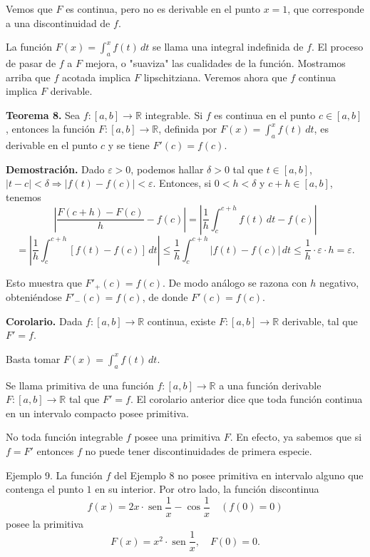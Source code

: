 \documentclass[12pt,oneside]{book}
\begin{document}
Vemos que \(F\) es continua, pero no es derivable en el punto \(x = 1\), que corresponde a una discontinuidad de \(f\).

La función \(F(x) = \int_a^x f(t) \, dt\) se llama una integral indefinida de \(f\). El proceso de pasar de \(f\) a \(F\) mejora, o "suaviza" las cualidades de la función. Mostramos arriba que \(f\) acotada implica \(F\) lipschitziana. Veremos ahora que \(f\) continua implica \(F\) derivable.

\textbf{Teorema 8.} Sea \(f: [a, b] \to \mathbb{R}\) integrable. Si \(f\) es continua en el punto \(c \in [a, b]\), entonces la función \(F: [a, b] \to \mathbb{R}\), definida por \(F(x) = \int_a^x f(t) \, dt\), es derivable en el punto \(c\) y se tiene \(F'(c) = f(c)\).

\textbf{Demostración.} Dado \(\varepsilon > 0\), podemos hallar \(\delta > 0\) tal que \(t \in [a, b]\), \(|t - c| < \delta \Rightarrow |f(t) - f(c)| < \varepsilon\). Entonces, si \(0 < h < \delta\) y \(c + h \in [a, b]\), tenemos
\[
\left| \frac{F(c + h) - F(c)}{h} - f(c) \right|= \left| \frac{1}{h} \int_c^{c+h} f(t) \, dt - f(c) \right|
\]
\[
= \left| \frac{1}{h} \int_c^{c+h} [f(t) - f(c)] \, dt \right|
\leq \frac{1}{h} \int_c^{c+h} |f(t) - f(c)| \, dt
\leq \frac{1}{h} \cdot \varepsilon \cdot h = \varepsilon.
\]

Esto muestra que \(F'_+(c) = f(c)\). De modo análogo se razona con \(h\) negativo, obteniéndose \(F'_-(c) = f(c)\), de donde \(F'(c) = f(c)\).

\textbf{Corolario.} Dada \(f: [a, b] \to \mathbb{R}\) continua, existe \(F: [a, b] \to \mathbb{R}\) derivable, tal que \(F' = f\).

Basta tomar \(F(x) = \int_a^x f(t) \, dt\).

Se llama primitiva de una función \(f: [a, b] \to \mathbb{R}\) a una función derivable \(F: [a, b] \to \mathbb{R}\) tal que \(F' = f\). El corolario anterior dice que toda función continua en un intervalo compacto posee primitiva.

No toda función integrable \(f\) posee una primitiva \(F\). En efecto, ya sabemos que si \(f = F'\) entonces \(f\) no puede tener discontinuidades de primera especie.

Ejemplo 9. La función \(f\) del Ejemplo 8 no posee primitiva en intervalo alguno que contenga el punto \(1\) en su interior. Por otro lado, la función discontinua
\[
f(x) = 2x \cdot \operatorname{sen} \frac{1}{x} - \cos \frac{1}{x} \quad (f(0) = 0)
\]
posee la primitiva
\[
F(x) = x^2 \cdot \operatorname{sen} \frac{1}{x}, \quad F(0) = 0.
\]
\end{document}
